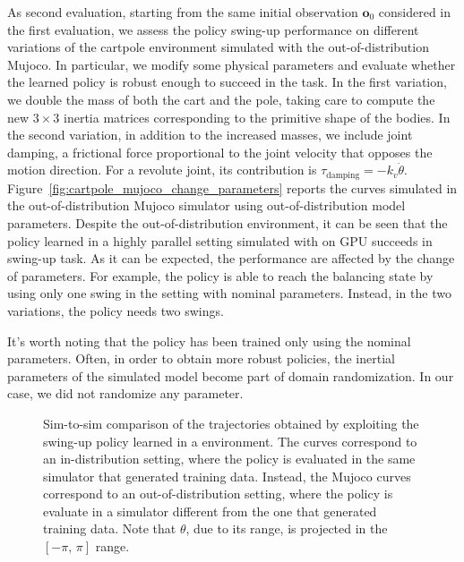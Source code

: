 As second evaluation, starting from the same initial observation $\mathbf{o}_0$ considered in the first evaluation, we assess the policy swing-up performance on different variations of the cartpole environment simulated with the out-of-distribution Mujoco.
In particular, we modify some physical parameters and evaluate whether the learned policy is robust enough to succeed in the task.
In the first variation, we double the mass of both the cart and the pole, taking care to compute the new $3\times 3$ inertia matrices corresponding to the primitive shape of the bodies.
In the second variation, in addition to the increased masses, we include joint damping, \ie a frictional force proportional to the joint velocity that opposes the motion direction.
For a revolute joint, its contribution is $\tau_\text{damping} = - k_v \dot{\theta}$.
Figure~\ref{fig:cartpole_mujoco_change_parameters} reports the curves simulated in the out-of-distribution Mujoco simulator using out-of-distribution model parameters.
Despite the out-of-distribution environment, it can be seen that the policy learned in a highly parallel setting simulated with \jaxsim on \ac{GPU} succeeds in swing-up task.
As it can be expected, the performance are affected by the change of parameters.
For example, the policy is able to reach the balancing state by using only one swing in the setting with nominal parameters.
Instead, in the two variations, the policy needs two swings.

It's worth noting that the policy has been trained only using the nominal parameters.
Often, in order to obtain more robust policies, the inertial parameters of the simulated model become part of domain randomization.
In our case, we did not randomize any parameter.

\begin{figure}
    \centering
    \caption{Sim-to-sim comparison of the trajectories obtained by exploiting the swing-up policy learned in a \jaxsim environment. The \jaxsim curves correspond to an in-distribution setting, where the policy is evaluated in the same simulator that generated training data. Instead, the Mujoco curves correspond to an out-of-distribution setting, where the policy is evaluate in a simulator different from the one that generated training data. Note that $\theta$, due to its range, is projected in the $[-\pi,\, \pi]$ range.}
    \label{fig:cartpole_trajectory_jaxsim_vs_mujoco}
\end{figure}


